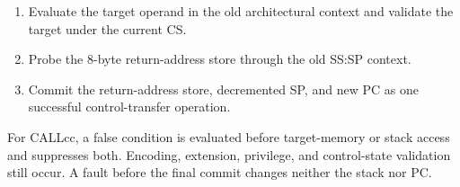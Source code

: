 \begin{enumerate}
\item Evaluate the target operand in the old architectural context and validate the target under the current CS.
\item Probe the 8-byte return-address store through the old SS:SP context.
\item Commit the return-address store, decremented SP, and new PC as one successful control-transfer operation.
\end{enumerate}

For CALLcc, a false condition is evaluated before target-memory or stack access and suppresses both. Encoding,
extension, privilege, and control-state validation still occur. A fault before the final commit changes neither the
stack nor PC.

